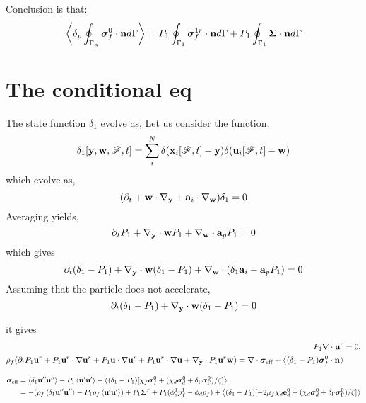 \documentclass[12pt]{My_preprint}
\begin{document}
Conclusion is that: 
\begin{equation}
    \pSavg{\bm\sigma_f^0 \cdot \textbf{n}}
    = P_1 \intS[1]{\bm\sigma_f^{1r} \cdot \textbf{n}}
    + P_1 \intS[1]{\bm\Sigma \cdot \textbf{n}}
\end{equation}

\section{The conditional eq}

The state function $\delta_1$ evolve as, 
Let us consider the function,
\begin{equation}
    \delta_1[\textbf{y},\textbf{w},\FF,t]
    = \sum_i^N 
    \delta(\textbf{x}_i[\FF,t] - \textbf{y})
    \delta(\textbf{u}_i[\FF,t] - \textbf{w})
\end{equation}
which evolve as, 
\begin{equation}
    (\pddt + \textbf{w} \cdot \pddy + \textbf{a}_i \cdot \pddw)\delta_1 = 0 
\end{equation}
Averaging yields,
\begin{equation}
    \pddt P_1  +  \pddy\cdot  \textbf{w} P_1 + \pddw \cdot  \textbf{a}_p P_1 = 0 
\end{equation}
which gives 
\begin{equation}
    \pddt (\delta_1 - P_1)  +  \pddy \cdot \textbf{w} (\delta_1 - P_1) + \pddw\cdot  (\delta_1\textbf{a}_i - \textbf{a}_p P_1) = 0 
\end{equation}
Assuming that the particle does not accelerate, 
\begin{equation}
    \pddt (\delta_1 - P_1)  +  \pddy \cdot \textbf{w} (\delta_1 - P_1) = 0 
\end{equation}

it gives 
\begin{align}
    P_1 \div \textbf{u}^r &= 0, \\
    \rho_f (\pddt P_1 \textbf{u}^r 
    + P_1 \textbf{u}^r \cdot \grad \textbf{u}^r 
    + P_1 \textbf{u} \cdot \grad \textbf{u}^r 
    + P_1 \textbf{u}^r \cdot \grad \textbf{u}
    + \pddy \cdot P_1 \textbf{u}^r \textbf{w})
    = \div \bm\sigma_\text{eff}
    + \avg{(\delta_1 - P_1) \bm\sigma_f^0 \cdot \textbf{n}}
\end{align}

\begin{align}
    \bm\sigma_\text{eff}
    &= 
    \avg{\delta_1 \textbf{u}''\textbf{u}''}
    - P_1 \avg{\textbf{u}'\textbf{u}'}
    + \avg{
        (\delta_1 - P_1)[
            \chi_f \bm\sigma_f^0 
            + (\chi_d \bm\sigma_d^0
            + \delta_\Gamma \bm\sigma_\Gamma^0)/\zeta
        ]
    }\\
    &= 
    - (\rho_f \avg{\delta_1 \textbf{u}''\textbf{u}''}
    - P_1\rho_f \avg{\textbf{u}'\textbf{u}'})
    +P_1 \bm\Sigma^r
    + P_1(\phi_d^1 p_f^1 - \phi_d p_f) 
    + \avg{
        (\delta_1 - P_1)[
            -2 \mu_f \chi_d \textbf{e}_d^0
            + (\chi_d \bm\sigma_d^0
            + \delta_\Gamma \bm\sigma_\Gamma^0)/\zeta
        ]
    }
\end{align}
\end{document}

